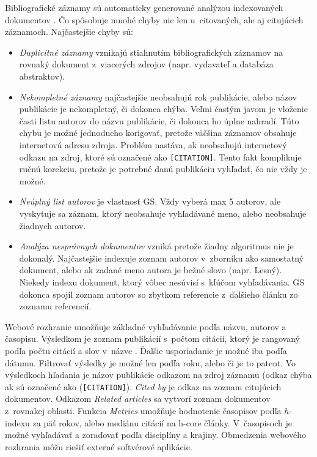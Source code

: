 Bibliografické záznamy sú automaticky generované analýzou indexovaných
dokumentov \citep{Vine2006}. Čo spôsobuje mnohé chyby nie len u~citovaných, ale
aj citujúcich záznamoch. Najčastejšie chyby sú:
\begin{itemize}
  \item \emph{Duplicitné záznamy} vznikajú stiahnutím bibliografických záznamov
    na rovnaký dokument z~viacerých zdrojov (napr. vydavateľ a databáza abstraktov).
  \item \emph{Nekompletné záznamy} najčastejšie neobsahujú rok publikácie,
    alebo názov publikácie je nekompletný, či dokonca chýba.  Veľmi častým
    javom je vloženie časti listu autorov do názvu publikácie, či dokonca ho
    úplne nahradí.  Túto chybu je možné jednoducho korigovať, pretože väčšina
    záznamov obsahuje internetovú adresu zdroja. Problém nastáva, ak neobsahujú
    internetový odkazu na zdroj, ktoré sú označené ako \texttt{[CITATION]}.
    Tento fakt komplikuje ručnú korekciu, pretože je potrebné danú publikáciu
    vyhľadať, čo nie vždy je možné.
  \item \emph{Neúplný list autorov} je vlastnosť GS. Vždy vyberá max 5 autorov,
    ale vyskytuje sa záznam, ktorý neobsahuje vyhľadávané meno, alebo neobsahuje
    žiadnych autorov.
  \item \emph{Analýza nesprávnych dokumentov} vzniká pretože žiadny algoritmus nie je
    dokonalý.  Najčastejšie indexuje zoznam autorov v~zborníku ako samostatný
    dokument, alebo ak zadané meno autora je bežné slovo (napr. Lesný).  Niekedy
    indexu dokument, ktorý vôbec nesúvisí s~kľúčom vyhľadávania.
    GS dokonca spojil zoznam autorov so zbytkom referencie z~ďalšieho článku zo
    zoznamu referencií.
\end{itemize}

\noindent Webové rozhranie umožňuje základné vyhľadávanie podľa názvu, autorov a
časopisu.  Výsledkom je zoznam publikácií s~počtom citácií, ktorý je rangovaný
podľa počtu citácií a slov v~názve \citep{Beel2009}.  Ďalšie usporiadanie je
možné iba podľa dátumu.  Filtrovať výsledky je možné len podľa roku, alebo či
je to patent.  Vo výsledkoch hľadania je názov publikácie odkazom na zdroj
záznamu (odkaz chýba ak sú označené ako (\texttt{[CITATION]}). \emph{Cited by}
je odkaz na zoznam citujúcich dokumentov.  Odkazom \emph{Related articles} sa
vytvorí zoznam dokumentov z~rovnakej oblasti.  Funkcia \emph{Metrics} umožňuje
hodnotenie časopisov podľa $h$-indexu za päť rokov, alebo mediánu citácií na
h-core články. V~časopisoch je možné vyhľadávať a zoraďovať podľa disciplíny a
krajiny.  Obmedzenia webového rozhrania môžu riešiť externé softvérové aplikácie.


